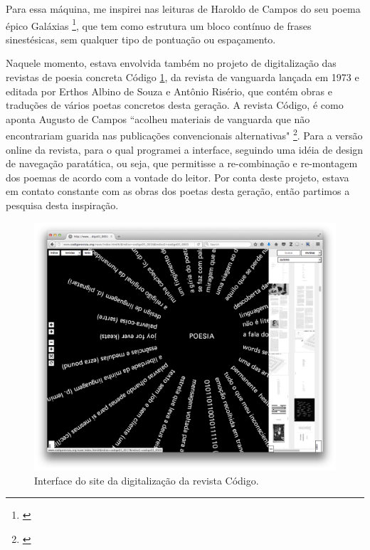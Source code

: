 Para essa máquina, me inspirei nas leituras de Haroldo de Campos do seu poema épico Galáxias \footnote{\cite{Campos2004}}, que tem como estrutura um bloco contínuo de frases sinestésicas, sem qualquer tipo de pontuação ou espaçamento. 

Naquele momento, estava envolvida também no projeto de digitalização das revistas de poesia concreta Código \ref{codigo}, da revista de vanguarda lançada em 1973 e editada por Erthos Albino de Souza e Antônio Risério, que contém obras e traduções de vários poetas concretos desta geração. A revista Código, é como aponta Augusto de Campos ``acolheu materiais de vanguarda que não encontrariam guarida nas publicações convencionais alternativas" \footnote{\cite{Scandurra2016}}. Para a versão online da revista, para o qual programei a interface, seguindo uma idéia de design de navegação paratática, ou seja, que permitisse a re-combinação e re-montagem dos poemas de acordo com a vontade do leitor. Por conta deste projeto, estava em contato constante com as obras dos poetas desta geração, então partimos a pesquisa desta inspiração.

\begin{figure}
    \caption{\label{codigo}Interface do site da digitalização da revista Código. }
    \begin{center}
    \includegraphics[width=1\linewidth]{pictures/cap3/codigo5.png}
    \end{center}
\end{figure}

